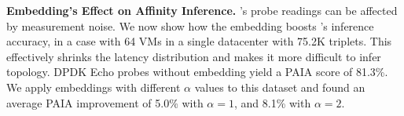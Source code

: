 
\noindent\textbf{Embedding's Effect on Affinity Inference.}
\marcopolo{}'s probe readings can be affected by measurement noise. We now show how the embedding boosts \marcopolo{}'s inference accuracy, in a case with 64 VMs in a single datacenter with 75.2K triplets. This effectively shrinks the latency distribution and makes it more difficult to infer topology. DPDK Echo probes without embedding yield a PAIA score of 81.3\%. We apply embeddings with different $\alpha$ values to this dataset and found an average PAIA improvement of 5.0\% with $\alpha=1$, and 8.1\%  with $\alpha=2$.%





